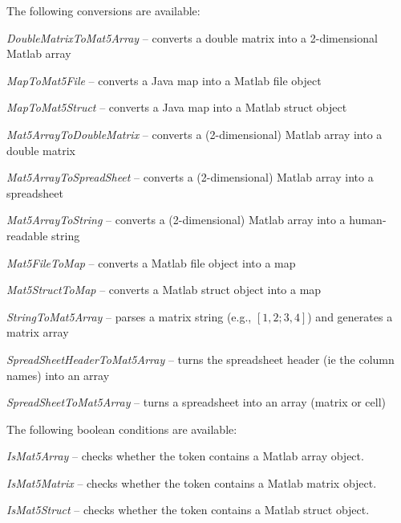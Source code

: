 \documentclass[a4paper]{book}
\begin{document}
The following conversions are available:
\begin{tight_itemize}
  \item \textit{DoubleMatrixToMat5Array} -- converts a double matrix into a 2-dimensional Matlab array
  \item \textit{MapToMat5File} -- converts a Java map into a Matlab file object
  \item \textit{MapToMat5Struct} -- converts a Java map into a Matlab struct object
  \item \textit{Mat5ArrayToDoubleMatrix} -- converts a (2-dimensional) Matlab array into a double matrix
  \item \textit{Mat5ArrayToSpreadSheet} -- converts a (2-dimensional) Matlab array into a spreadsheet
  \item \textit{Mat5ArrayToString} -- converts a (2-dimensional) Matlab array into a human-readable string
  \item \textit{Mat5FileToMap} -- converts a Matlab file object into a map
  \item \textit{Mat5StructToMap} -- converts a Matlab struct object into a map
  \item \textit{StringToMat5Array} -- parses a matrix string (e.g., $[1, 2; 3, 4]$) and generates a matrix array
  \item \textit{SpreadSheetHeaderToMat5Array} -- turns the spreadsheet header (ie the column names) into an array
  \item \textit{SpreadSheetToMat5Array} -- turns a spreadsheet into an array (matrix or cell)
\end{tight_itemize}

The following boolean conditions are available:
\begin{tight_itemize}
  \item \textit{IsMat5Array} -- checks whether the token contains a Matlab array object.
  \item \textit{IsMat5Matrix} -- checks whether the token contains a Matlab matrix object.
  \item \textit{IsMat5Struct} -- checks whether the token contains a Matlab struct object.
\end{tight_itemize}



\end{document}
